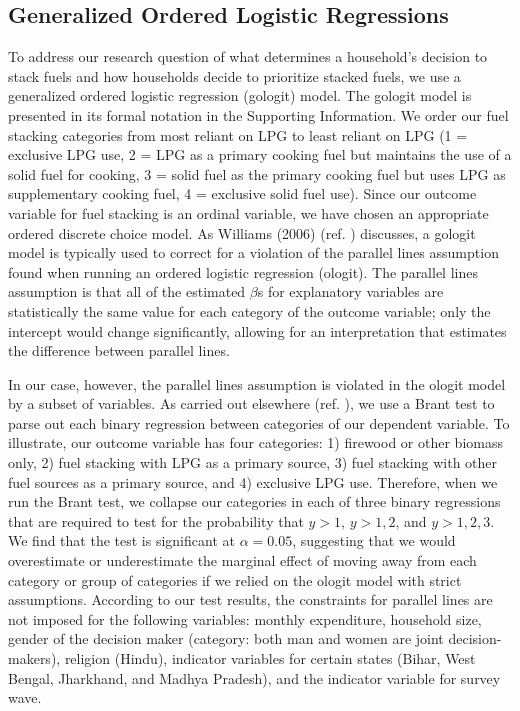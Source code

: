 \documentclass[11pt,english]{article}
\theoremstyle{plain} \newtheorem{claim}{Claim}
\theoremstyle{plain} \newtheorem{prop}{Proposition}
\theoremstyle{plain} \newtheorem{hypo}{Hypothesis}
\begin{document}
\subsection*{Generalized Ordered Logistic Regressions}

To address our research question of what determines a household's decision to stack fuels and how households decide to prioritize stacked fuels, we use a generalized ordered logistic regression (gologit) model. The gologit model is presented in its formal notation in the Supporting Information. We order our fuel stacking categories from most reliant on LPG to least reliant on LPG (1 = exclusive LPG use, 2 = LPG as a primary cooking fuel but maintains the use of a solid fuel for cooking, 3 = solid fuel as the primary cooking fuel but uses LPG as supplementary cooking fuel, 4 = exclusive solid fuel use). Since our outcome variable for fuel stacking is an ordinal variable, we have chosen an appropriate ordered discrete choice model. As Williams (2006) (ref. \citep{Williams2006}) discusses, a gologit model is typically used to correct for a violation of the parallel lines assumption found when running an ordered logistic regression (ologit). The parallel lines assumption is that all of the estimated $\beta$s for explanatory variables are statistically the same value for each category of the outcome variable; only the intercept would change significantly, allowing for an interpretation that estimates the difference between parallel lines.

In our case, however, the parallel lines assumption is violated in the ologit model by a subset of variables. As carried out elsewhere (ref. \citep{Williams2006}), we use a Brant test to parse out each binary regression between categories of our dependent variable. To illustrate, our outcome variable has four categories: 1) firewood or other biomass only, 2) fuel stacking with LPG as a primary source, 3) fuel stacking with other fuel sources as a primary source, and 4) exclusive LPG use. Therefore, when we run the Brant test, we collapse our categories in each of three binary regressions that are required to test for the probability that $y>1$, $y>1,2$, and $y>1,2,3$. We find that the test is significant at $\alpha = 0.05$, suggesting that we would overestimate or underestimate the marginal effect of moving away from each category or group of categories if we relied on the ologit model with strict assumptions. According to our test results, the constraints for parallel lines are not imposed for the following variables: monthly expenditure, household size, gender of the decision maker (category: both man and women are joint decision-makers), religion (Hindu), indicator variables for certain states (Bihar, West Bengal, Jharkhand, and Madhya Pradesh), and the indicator variable for survey wave.
\end{document}
